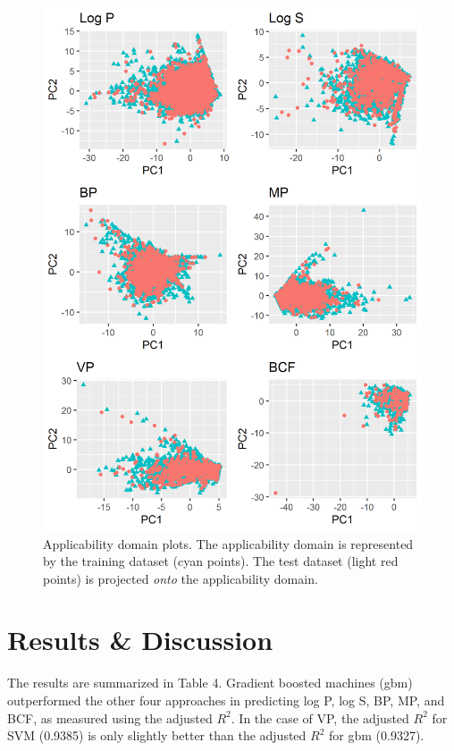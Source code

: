 \documentclass[10pt, letter]{article}
\renewcommand{\=}{\, =\, }
\newcommand{\+}{\, +\, }
\renewcommand{\-}{\, -\, }
\begin{document}
\begin{figure}[H]
  \caption{Applicability domain plots. The applicability domain is represented by the training dataset (cyan points). The test dataset (light red points) is projected \textit{onto} the applicability domain.}
  \centering
    \includegraphics[scale=1.0]{PC_plots.png}
\end{figure}


\section{Results \& Discussion}

The results are summarized in Table 4. Gradient boosted machines (gbm) outperformed the other four approaches in predicting log P, log S,
 BP, MP, and BCF, as measured using the adjusted \( R^2\). In the case of VP, the adjusted \( R^2\) for SVM (0.9385) is only slightly better than the adjusted \( R^2\) for gbm (0.9327).
\end{document}
